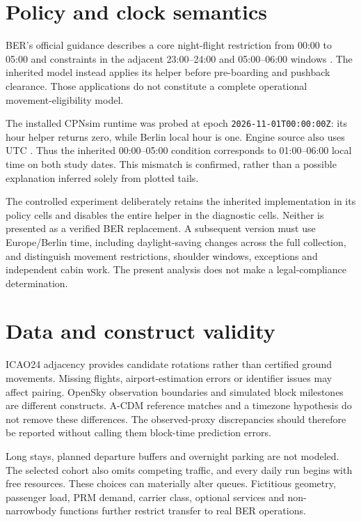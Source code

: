 \section{Policy and clock semantics}
BER's official guidance describes a core night-flight restriction from 00:00 to 05:00 and constraints in the adjacent 23:00--24:00 and 05:00--06:00 windows \cite{ber_night}. The inherited model instead applies its helper before pre-boarding and pushback clearance. Those applications do not constitute a complete operational movement-eligibility model.

The installed CPNsim runtime was probed at epoch \texttt{2026-11-01T00:00:00Z}: its hour helper returns zero, while Berlin local hour is one. Engine source also uses UTC \cite{cpnsim}. Thus the inherited 00:00--05:00 condition corresponds to 01:00--06:00 local time on both study dates. This mismatch is confirmed, rather than a possible explanation inferred solely from plotted tails.

The controlled experiment deliberately retains the inherited implementation in its policy cells and disables the entire helper in the diagnostic cells. Neither is presented as a verified BER replacement. A subsequent version must use Europe/Berlin time, including daylight-saving changes across the full collection, and distinguish movement restrictions, shoulder windows, exceptions and independent cabin work. The present analysis does not make a legal-compliance determination.

\section{Data and construct validity}
ICAO24 adjacency provides candidate rotations rather than certified ground movements. Missing flights, airport-estimation errors or identifier issues may affect pairing. OpenSky observation boundaries and simulated block milestones are different constructs. A-CDM reference matches and a timezone hypothesis do not remove these differences. The observed-proxy discrepancies should therefore be reported without calling them block-time prediction errors.

Long stays, planned departure buffers and overnight parking are not modeled. The selected cohort also omits competing traffic, and every daily run begins with free resources. These choices can materially alter queues. Fictitious geometry, passenger load, PRM demand, carrier class, optional services and non-narrowbody functions further restrict transfer to real BER operations.

